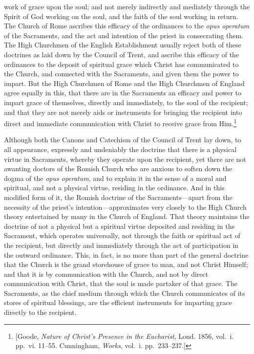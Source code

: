 \documentclass[
]{book}
\begin{document}
work of grace upon the soul; and not merely indirectly and mediately through the Spirit of God working on the soul, and the faith of the soul working in return. The Church of Rome ascribes this efficacy of the ordinances to the \foreignlanguage{latin}{\emph{opus operatum}} of the Sacraments, and the act and intention of the priest in consecrating them. The High Churchmen of the English Establishment usually reject both of these doctrines as laid down by the Council of Trent, and ascribe this efficacy of the ordinances to the deposit of spiritual grace which Christ has communicated to the Church, and connected with the Sacraments, and given them the power to impart. But the High Churchmen of Rome and the High Churchmen of England agree equally in this, that there are in the Sacraments an efficacy and power to impart grace of themselves, directly and immediately, to the soul of the recipient; and that they are not merely aids or instruments for bringing the recipient into direct and immediate communication with Christ to receive grace from Him.\footnote{{[}Goode, \emph{Nature of Christ's Presence in the Eucharist}, Lond. 1856, vol.~i. pp.~vi. 11--55. Cunningham, \emph{Works}, vol.~i. pp.~233--237.{]}}

Although both the Canons and Catechism of the Council of Trent lay down, to all appearance, expressly and undeniably the doctrine that there is a physical virtue in Sacraments, whereby they operate upon the recipient, yet there are not awanting doctors of the Romish Church who are anxious to soften down the dogma of the \foreignlanguage{latin}{\emph{opus operatum}}, and to explain it in the sense of a moral and spiritual, and not a physical virtue, residing in the ordinance. And in this modified form of it, the Romish doctrine of the Sacraments---apart from the necessity of the priest's intention---approximates very closely to the High Church theory entertained by many in the Church of England. That theory maintains the doctrine of not a physical but a spiritual virtue deposited and residing in the Sacrament, which operates universally, not through the faith or spiritual act of the recipient, but directly and immediately through the act of participation in the outward ordinance. This, in fact, is no more than part of the general doctrine that the Church is the grand storehouse of grace to man, and not Christ Himself; and that it is by communication with the Church, and not by direct communication with Christ, that the soul is made partaker of that grace. The Sacraments, as the chief medium through which the Church communicates of its stores of spiritual blessings, are the efficient instruments for imparting grace directly to the recipient.
\end{document}
